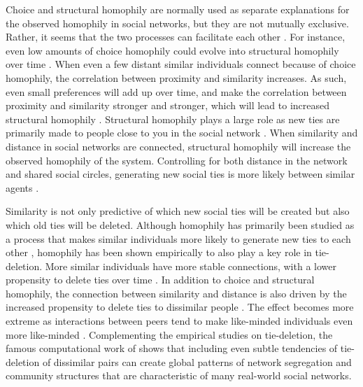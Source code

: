 \documentclass[11pt]{article}
\begin{document}
\noindent Choice and structural homophily are normally used as separate explanations for the observed homophily in social networks, but they are not mutually exclusive. Rather, it seems that the two processes can facilitate each other \cite{asikainen_cumulative_2020}. For instance, even low amounts of choice homophily could evolve into structural homophily over time \cite{asikainen_cumulative_2020,kossinets_origins_2009,taylor_exploring_2018}. When even a few distant similar individuals connect because of choice homophily, the correlation between proximity and similarity increases. As such, even small preferences will add up over time, and make the correlation between proximity and similarity stronger and stronger, which will lead to increased structural homophily \cite{kossinets_origins_2009}. 
Structural homophily plays a large role as new ties are primarily made to people close to you in the social network \cite{bianconi_triadic_2014, peixoto_disentangling_2022}. When similarity and distance in social networks are connected, structural homophily will increase the observed homophily of the system. Controlling for both distance in the network and shared social circles, generating new social ties is more likely between similar agents \cite{kossinets_origins_2009, bener_empirical_2016}.

\noindent Similarity is not only predictive of which new social ties will be created but also which old ties will be deleted. Although homophily has primarily been studied as a process that makes similar individuals more likely to generate new ties to each other \cite{noel2011unfriending, bener_empirical_2016}, homophily has been shown empirically to also play a key role in tie-deletion. More similar individuals have more stable connections, with a lower propensity to delete ties over time \cite{noel2011unfriending, bener_empirical_2016, mcpherson_birds_2001, kossinets_origins_2009}.
In addition to choice and structural homophily, the connection between similarity and distance is also driven by the increased propensity to delete ties to dissimilar people \cite{kossinets_origins_2009, bener_empirical_2016}. The effect becomes more extreme as interactions between peers tend to make like-minded individuals even more like-minded \cite{friedkin_social_1990, spears_social_2021}. Complementing the empirical studies on tie-deletion, the famous computational work of  shows that including even subtle tendencies of tie-deletion of dissimilar pairs can create global patterns of network segregation and community structures that are characteristic of many real-world social networks. 
\end{document}

